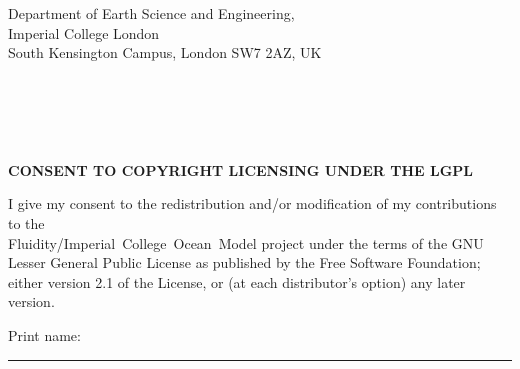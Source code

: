 \documentclass[blank]{impletter}
\begin{document}
\headers{
\mbox{}\\
\\
\\
\\
\\
}
{

}
{
Department of Earth Science and Engineering,\\
Imperial College London\\

South Kensington Campus, London SW7 2AZ, UK\\
\\

\mbox{}\\
\\
}
{
\mbox{}
}
{
\\
}
{
\\
}
\textbf{CONSENT TO COPYRIGHT LICENSING UNDER THE LGPL}
\informal

I give my consent to the redistribution and/or modification of my 
contributions to the\\
\mbox{Fluidity/Imperial College Ocean Model} project 
under the terms of the GNU Lesser General Public License as published 
by the Free Software Foundation; either version 2.1 of the License, or
(at each distributor's option) any later version.

\vspace{2cm}

{
Print name: \rule{8cm}{0.1mm}
}
\end{document}
